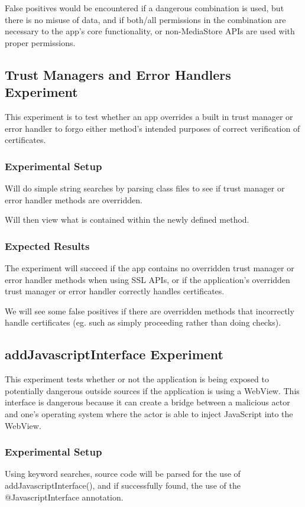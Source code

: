 \documentclass[10pt,twocolumn,pdftex]{article}
\begin{document}
    False positives would be encountered if
    a dangerous combination is used, but there is no misuse of data, and if both/all permissions in the combination are necessary to the app’s core functionality, or 
    non-MediaStore APIs are used with proper permissions.


\subsection{Trust Managers and Error Handlers Experiment}
    This experiment is to test whether an app overrides a built in trust manager or error handler to forgo either method's intended purposes of correct verification of certificates. 

    \subsubsection{Experimental Setup}
    Will do simple string searches by parsing class files to see if trust manager or error handler methods are overridden.
    
    Will then view what is contained within the newly defined method. 

    \subsubsection{Expected Results}
    The experiment will succeed if the app contains no overridden trust manager or error handler methods when using SSL APIs, or if the application's overridden trust manager or error handler correctly handles certificates.

    We will see some false positives if there are overridden methods that incorrectly handle certificates (eg. such as simply proceeding rather than doing checks).


\subsection{addJavascriptInterface Experiment}
This experiment tests whether or not the application is being exposed to potentially dangerous outside sources if the application is using a WebView. This interface is dangerous because it can create a bridge between a malicious actor and one's operating system where the actor is able to inject JavaScript into the WebView.

    \subsubsection{Experimental Setup}
        Using keyword searches, source code will be parsed for the use of addJavascriptInterface(), and if successfully found, the use of the @JavascriptInterface annotation.
\end{document}
